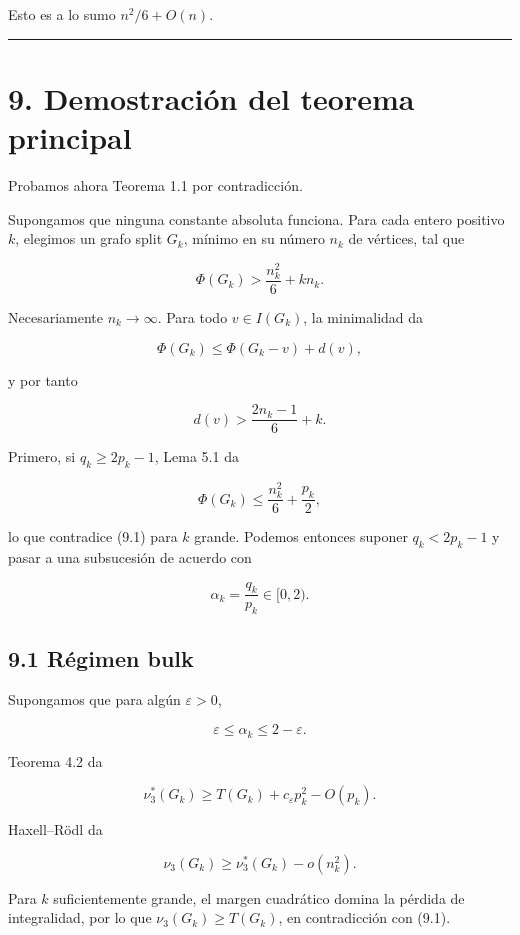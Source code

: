 \documentclass[
  11pt,
]{article}
\begin{document}
Esto es a lo sumo \(n^2/6+O(n)\).

\begin{center}\rule{0.5\linewidth}{0.5pt}\end{center}

\section{9. Demostración del teorema
principal}\label{demostraciuxf3n-del-teorema-principal}

Probamos ahora Teorema 1.1 por contradicción.

Supongamos que ninguna constante absoluta funciona. Para cada entero
positivo \(k\), elegimos un grafo split \(G_k\), mínimo en su número
\(n_k\) de vértices, tal que

\[
\Phi(G_k)
>
\frac{n_k^2}{6}+kn_k.
\tag{9.1}
\]

Necesariamente \(n_k\to\infty\). Para todo \(v\in I(G_k)\), la
minimalidad da

\[
\Phi(G_k)
\le
\Phi(G_k-v)+d(v),
\]

y por tanto

\[
\boxed{
d(v)>
\frac{2n_k-1}{6}+k.
}
\tag{9.2}
\]

Primero, si \(q_k\ge2p_k-1\), Lema 5.1 da

\[
\Phi(G_k)
\le
\frac{n_k^2}{6}+\frac{p_k}{2},
\]

lo que contradice (9.1) para \(k\) grande. Podemos entonces suponer
\(q_k<2p_k-1\) y pasar a una subsucesión de acuerdo con

\[
\alpha_k=\frac{q_k}{p_k}\in[0,2).
\]

\subsection{9.1 Régimen bulk}\label{ruxe9gimen-bulk}

Supongamos que para algún \(\varepsilon>0\),

\[
\varepsilon\le\alpha_k\le2-\varepsilon.
\]

Teorema 4.2 da

\[
\nu_3^*(G_k)
\ge
T(G_k)+c_\varepsilon p_k^2-O(p_k).
\]

Haxell--Rödl da

\[
\nu_3(G_k)
\ge
\nu_3^*(G_k)-o(n_k^2).
\]

Para \(k\) suficientemente grande, el margen cuadrático domina la
pérdida de integralidad, por lo que \(\nu_3(G_k)\ge T(G_k)\), en
contradicción con (9.1).
\end{document}

